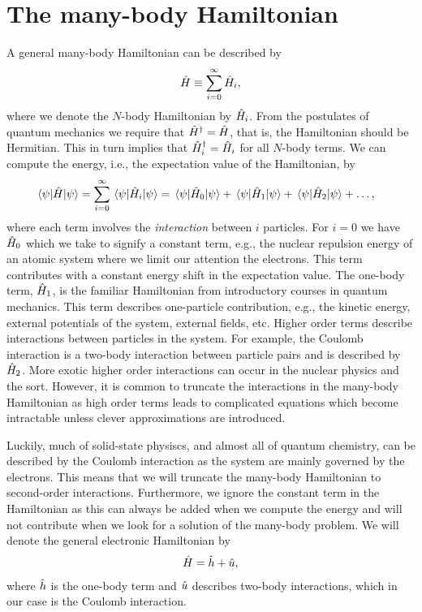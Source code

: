     \section{The many-body Hamiltonian}
        A general many-body Hamiltonian can be described by
        \begin{align}
            \hat{H} \equiv \sum_{i = 0}^{\infty} \hat{H}_i,
        \end{align}
        where we denote the $N$-body Hamiltonian by $\hat{H}_i$.
        From the postulates of quantum mechanics we require that
        $\hat{H}^{\dagger} = \hat{H}$, that is, the Hamiltonian should be
        Hermitian.
        This in turn implies that $\hat{H}_i^{\dagger} = \hat{H}_i$ for all
        $N$-body terms.
        We can compute the energy, i.e., the expectation value of the
        Hamiltonian, by
        \begin{align}
            \mel{\psi}{\hat{H}}{\psi}
            &= \sum_{i = 0}^{\infty} \mel{\psi}{\hat{H}_i}{\psi}
            = \mel{\psi}{\hat{H}_0}{\psi}
            + \mel{\psi}{\hat{H}_1}{\psi}
            + \mel{\psi}{\hat{H}_2}{\psi}
            + \dots,
        \end{align}
        where each term involves the \emph{interaction} between $i$ particles.
        For $i = 0$ we have $\hat{H}_0$ which we take to signify a constant term,
        e.g., the nuclear repulsion energy of an atomic system where we limit
        our attention the electrons.
        This term contributes with a constant energy shift in the expectation
        value.
        The one-body term, $\hat{H}_1$, is the familiar Hamiltonian from
        introductory courses in quantum mechanics.
        This term describes one-particle contribution, e.g., the kinetic
        energy, external potentials of the system, external fields, etc.
        Higher order terms describe interactions between particles in the
        system.
        For example, the Coulomb interaction is a two-body interaction between
        particle pairs and is described by $\hat{H}_2$.
        More exotic higher order interactions can occur in the nuclear physics
        and the sort.
        However, it is common to truncate the interactions in the many-body
        Hamiltonian as high order terms leads to complicated equations which
        become intractable unless clever approximations are introduced.

        Luckily, much of solid-state physiscs, and almost all of quantum
        chemistry, can be described by the Coulomb interaction as the system are
        mainly governed by the electrons.
        This means that we will truncate the many-body Hamiltonian to
        second-order interactions.
        Furthermore, we ignore the constant term in the Hamiltonian as this can
        always be added when we compute the energy and will not contribute when
        we look for a solution of the many-body problem.
        We will denote the general electronic Hamiltonian by
        \begin{align}
            \hat{H} = \hat{h} + \hat{u},
        \end{align}
        where $\hat{h}$ is the one-body term and $\hat{u}$ describes
        two-body interactions, which in our case is the Coulomb interaction.

